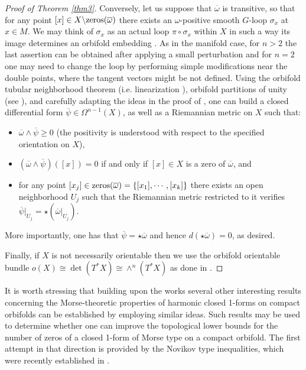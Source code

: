 \documentclass[
  a4paper, 
  reqno, 
  oneside, 
  12pt
]{amsart}
\theoremstyle{definition}
\theoremstyle{remark}
\begin{document}
\begin{proof}[Proof of Theorem \ref{thm3}]
Conversely, let us suppose that $\overline{\omega}$ is transitive, so that for any point $[x]\in X\backslash \textnormal{zeros}(\overline{\omega})$ there exists an $\omega$-positive smooth $G$-loop $\sigma_x$ at $x\in M$. We may think of $\sigma_x$ as an actual loop $\pi\circ \sigma_x$ within $X$ in such a way its image determines an orbifold embedding \cite{BorzeBrun,ChoHongShin}. As in the manifold case, for $n>2$ the last assertion can be obtained after applying a small perturbation 
and for $n = 2$ one may need to change the loop by performing simple modifications near the double points, where the tangent vectors might be not defined. Using the orbifold tubular neighborhood theorem (i.e. linearization \cite{dHF2}), orbifold partitions of unity (see \cite{KleinerLott,CM}), and carefully adapting the ideas in the proof of \cite[Thm. 9.11]{F}, one can build a closed differential form $\overline{\psi}\in \Omega^{n-1}(X)$, as well as a Riemannian metric on $X$ such that:
\begin{itemize}
\item $\overline{\omega}\wedge \overline{\psi}\geq 0$ (the positivity is understood with respect to the specified orientation on $X$),
\item $(\overline{\omega}\wedge \overline{\psi})([x])=0$ if and only if $[x]\in X$ is a zero of $\overline{\omega}$, and
\item for any point $[x_j]\in \textnormal{zeros}(\overline{\omega})=\lbrace [x_1],\cdots, [x_k]\rbrace$ there exists an open neighborhood $U_j$ such that the Riemannian metric restricted to it verifies $\overline{\psi}|_{U_j}=\star (\overline{\omega}|_{U_j})$.
\end{itemize}

More importantly, one has that $\overline{\psi}=\star \overline{\omega}$ and hence $d(\star \overline{\omega})=0$, as desired. 

Finally, if $X$ is not necessarily orientable	 then we use the orbifold orientable bundle $o(X)\cong \det (T^\ast X)\cong \wedge^n(T^\ast X)$ as done in \cite[s. 9.4.4]{F}.
\end{proof}

It is worth stressing that building upon the works \cite{FKL,Honda} several other interesting results concerning the Morse-theoretic properties of harmonic closed 1-forms on compact orbifolds can be established by employing similar ideas. Such results may be used to determine whether one can improve the topological lower bounds for the number of zeros of a closed 1-form of Morse type on a compact orbifold. The first attempt in that direction is provided by the Novikov type inequalities, which were recently established in \cite{V}.
\end{document}
